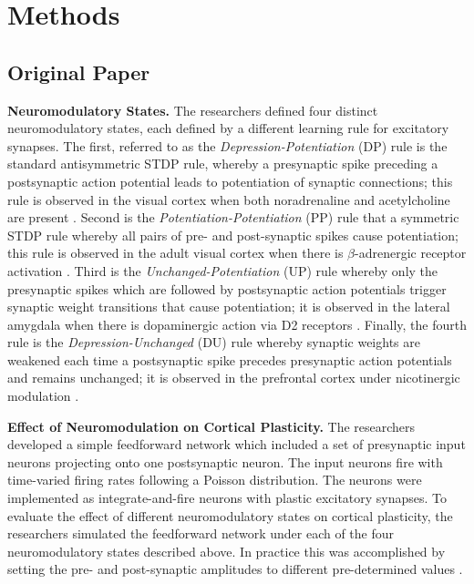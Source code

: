 \section{Methods}

\subsection{Original Paper}

\textbf{Neuromodulatory States.} The researchers defined four distinct neuromodulatory states, each defined by a different learning rule for excitatory synapses. The first, referred to as the \textit{Depression-Potentiation} (DP) rule is the standard antisymmetric STDP rule, whereby a presynaptic spike preceding a postsynaptic action potential leads to potentiation of synaptic connections; this rule is observed in the visual cortex when both noradrenaline and acetylcholine are present \cite{seolNeuromodulatorsControlPolarity2007}. Second is the \textit{Potentiation-Potentiation} (PP) rule that a  symmetric STDP rule whereby all pairs of pre- and post-synaptic spikes cause potentiation; this rule is observed in the adult visual cortex when there is $\beta$-adrenergic receptor activation \cite{seolNeuromodulatorsControlPolarity2007}. Third is the \textit{Unchanged-Potentiation} (UP) rule whereby only the presynaptic spikes which are followed by postsynaptic action potentials trigger synaptic weight transitions that cause potentiation; it is observed in the lateral amygdala when there is dopaminergic action via D2 receptors \cite{pedrosaRoleNeuromodulatorsCortical2017}. Finally, the fourth rule is the \textit{Depression-Unchanged} (DU) rule whereby  synaptic weights are weakened each time a postsynaptic spike precedes presynaptic action potentials and remains unchanged; it is observed in the prefrontal cortex under nicotinergic modulation \cite{pedrosaRoleNeuromodulatorsCortical2017}.

\textbf{Effect of Neuromodulation on Cortical Plasticity.} The researchers developed a simple feedforward network which included a set of presynaptic input neurons projecting onto one postsynaptic neuron. The input neurons fire with time-varied firing rates following a Poisson distribution. The neurons were implemented as integrate-and-fire neurons with plastic excitatory synapses.  To evaluate the effect of different neuromodulatory states on cortical plasticity, the researchers simulated the feedforward network under each of the four neuromodulatory states described above. In practice this was accomplished by setting the pre- and post-synaptic amplitudes to different pre-determined values \cite{pedrosaRoleNeuromodulatorsCortical2017}.

